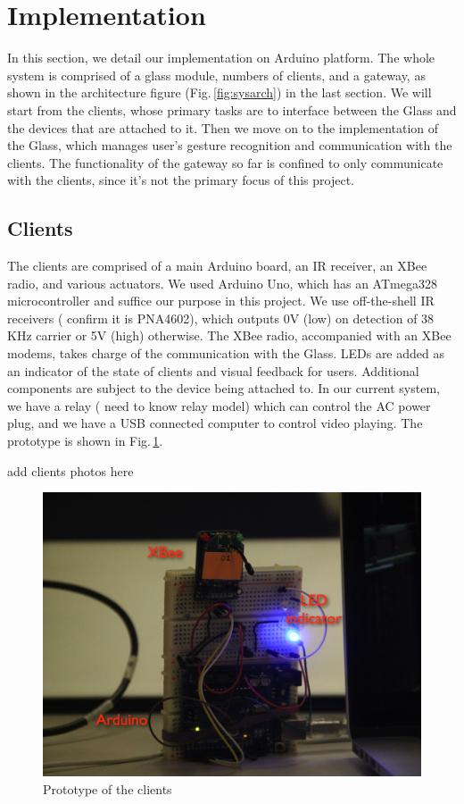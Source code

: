\section{Implementation}
\label{sec:implementation}

In this section, we detail our implementation on Arduino \cite{Arduino} platform. The whole system is comprised of a glass module, numbers of clients, and a gateway, as shown in the architecture figure (Fig.\,\ref{fig:sysarch}) in the last section. We will start from the clients, whose primary tasks are to interface between the Glass and the devices that are attached to it. Then we move on to the implementation of the Glass, which manages user's gesture recognition and communication with the clients. The functionality of the gateway so far is confined to only communicate with the clients, since it's not the primary focus of this project.

\subsection{Clients}
The clients are comprised of a main Arduino board, an IR receiver, an XBee radio, and various actuators. We used Arduino Uno, which has an ATmega328 microcontroller and suffice our purpose in this project. We use off-the-shell IR receivers ({\color{red} confirm it is PNA4602}), which outputs 0V (low) on detection of 38 KHz carrier or 5V (high) otherwise. The XBee radio, accompanied with an XBee modems, takes charge of the communication with the Glass. LEDs are added as an indicator of the state of clients and visual feedback for users. Additional components are subject to the device being attached to. In our current system, we have a relay ({\color{red} need to know relay model}) which can control the AC power plug, and we have a USB connected computer to control video playing. The prototype is shown in Fig.\,\ref{fig:client}.

{\color{red} add clients photos here}
\begin{figure}
  \centering
  \includegraphics[width=\linewidth]{../figs/client.png}
  \caption{Prototype of the clients}
  \label{fig:client}
\end{figure}

